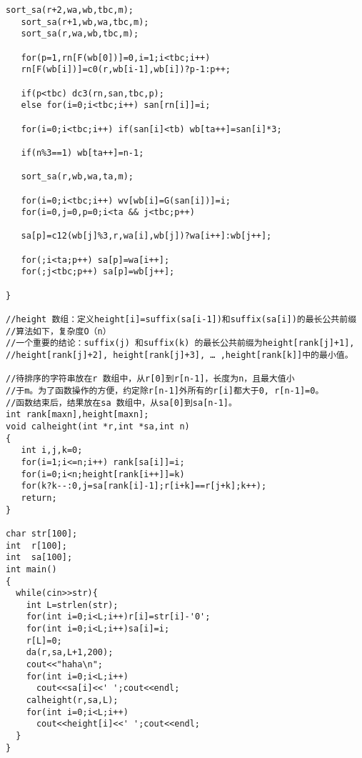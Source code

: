 \begin{lstlisting}[language={}]
   sort_sa(r+2,wa,wb,tbc,m);
   sort_sa(r+1,wb,wa,tbc,m);
   sort_sa(r,wa,wb,tbc,m);
   
   for(p=1,rn[F(wb[0])]=0,i=1;i<tbc;i++)
   rn[F(wb[i])]=c0(r,wb[i-1],wb[i])?p-1:p++;
   
   if(p<tbc) dc3(rn,san,tbc,p);
   else for(i=0;i<tbc;i++) san[rn[i]]=i;
   
   for(i=0;i<tbc;i++) if(san[i]<tb) wb[ta++]=san[i]*3;
   
   if(n%3==1) wb[ta++]=n-1;
   
   sort_sa(r,wb,wa,ta,m);
   
   for(i=0;i<tbc;i++) wv[wb[i]=G(san[i])]=i;
   for(i=0,j=0,p=0;i<ta && j<tbc;p++)
   
   sa[p]=c12(wb[j]%3,r,wa[i],wb[j])?wa[i++]:wb[j++];
   
   for(;i<ta;p++) sa[p]=wa[i++];
   for(;j<tbc;p++) sa[p]=wb[j++];
   
} 

//height 数组：定义height[i]=suffix(sa[i-1])和suffix(sa[i])的最长公共前缀
//算法如下，复杂度O（n）
//一个重要的结论：suffix(j) 和suffix(k) 的最长公共前缀为height[rank[j]+1],
//height[rank[j]+2], height[rank[j]+3], … ,height[rank[k]]中的最小值。 

//待排序的字符串放在r 数组中，从r[0]到r[n-1]，长度为n，且最大值小
//于m。为了函数操作的方便，约定除r[n-1]外所有的r[i]都大于0, r[n-1]=0。
//函数结束后，结果放在sa 数组中，从sa[0]到sa[n-1]。
int rank[maxn],height[maxn];
void calheight(int *r,int *sa,int n)
{
   int i,j,k=0;
   for(i=1;i<=n;i++) rank[sa[i]]=i;
   for(i=0;i<n;height[rank[i++]]=k)
   for(k?k--:0,j=sa[rank[i]-1];r[i+k]==r[j+k];k++);
   return;
} 

char str[100];
int  r[100];
int  sa[100];
int main()
{
  while(cin>>str){
    int L=strlen(str);
    for(int i=0;i<L;i++)r[i]=str[i]-'0';
    for(int i=0;i<L;i++)sa[i]=i;
    r[L]=0;
    da(r,sa,L+1,200); 
    cout<<"haha\n";
    for(int i=0;i<L;i++)
      cout<<sa[i]<<' ';cout<<endl;
    calheight(r,sa,L);
    for(int i=0;i<L;i++)
      cout<<height[i]<<' ';cout<<endl;
  }
}
\end{lstlisting}

